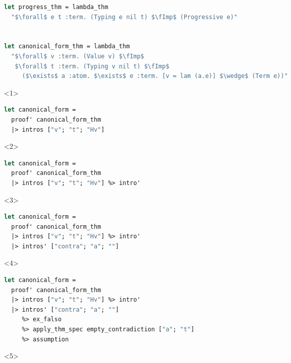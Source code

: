 \documentclass[aspectratio=169]{beamer}
\begin{document}
\begin{frame}[fragile]
\begin{lstlisting}[mathescape,language=OCaml,escapebegin=\color{codepurple}]
let progress_thm = lambda_thm
  "$\forall$ e t :term. (Typing e nil t) $\fImp$ (Progressive e)"


let canonical_form_thm = lambda_thm
  "$\forall$ v :term. (Value v) $\fImp$
   $\forall$ t :term. (Typing v nil t) $\fImp$
     ($\exists$ a :atom. $\exists$ e :term. [v = lam (a.e)] $\wedge$ (Term e))"
\end{lstlisting}
\end{frame}

\begin{frame}[fragile]
\begin{overlayarea}{\linewidth}{3.5cm}
  \begin{onlyenv}<1>
  \begin{lstlisting}[mathescape,language=OCaml,escapebegin=\color{codepurple}]
let canonical_form =
  proof' canonical_form_thm
  |> intros ["v"; "t"; "Hv"]
\end{lstlisting}
\end{onlyenv}
\begin{onlyenv}<2>
  \begin{lstlisting}[mathescape,language=OCaml,escapebegin=\color{codepurple}]
let canonical_form =
  proof' canonical_form_thm
  |> intros ["v"; "t"; "Hv"] %> intro'
\end{lstlisting}
\end{onlyenv}
  \begin{onlyenv}<3>
  \begin{lstlisting}[mathescape,language=OCaml,escapebegin=\color{codepurple}]
let canonical_form =
  proof' canonical_form_thm
  |> intros ["v"; "t"; "Hv"] %> intro'
  |> intros' ["contra"; "a"; ""]
\end{lstlisting}
\end{onlyenv}
  \begin{onlyenv}<4>
  \begin{lstlisting}[mathescape,language=OCaml,escapebegin=\color{codepurple}]
let canonical_form =
  proof' canonical_form_thm
  |> intros ["v"; "t"; "Hv"] %> intro'
  |> intros' ["contra"; "a"; ""]
     %> ex_falso
     %> apply_thm_spec empty_contradiction ["a"; "t"]
     %> assumption
\end{lstlisting}
\end{onlyenv}
  \begin{onlyenv}<5>
  \begin{lstlisting}[mathescape,language=OCaml,escapebegin=\color{codepurple}]

\end{lstlisting}
\end{onlyenv}
\end{overlayarea}
\end{frame}
\end{document}
